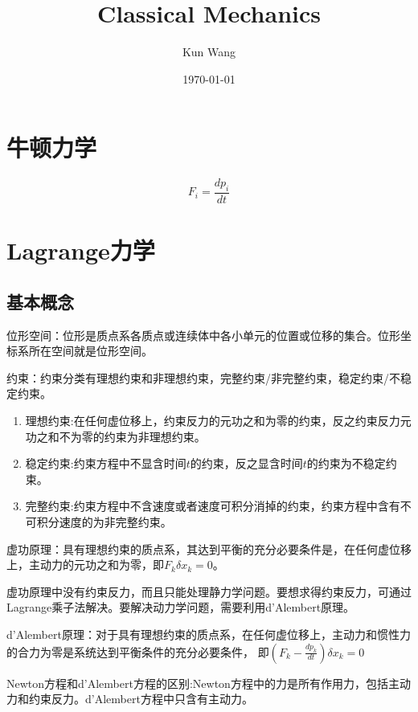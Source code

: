 \documentclass[12pt]{article}
\title{Classical Mechanics}
\author{Kun Wang}
\date{\today}
\numberwithin{equation}{section}
\begin{document}
        \tableofcontents
        \newpage
        \maketitle
        \section{牛顿力学}
        \begin{equation}
            F_i=\frac{dp_i}{dt}
        \end{equation}

        \section{Lagrange力学}

        \subsection{基本概念\cite{2006shen}}

        位形空间：位形是质点系各质点或连续体中各小单元的位置或位移的集合。位形坐标系所在空间就是位形空间。

        约束：约束分类有理想约束和非理想约束，完整约束/非完整约束，稳定约束/不稳定约束。
        \begin{enumerate}
            \item 理想约束:在任何虚位移上，约束反力的元功之和为零的约束，反之约束反力元功之和不为零的约束为非理想约束。
            \item 稳定约束:约束方程中不显含时间$t$的约束，反之显含时间$t$的约束为不稳定约束。
            \item 完整约束:约束方程中不含速度或者速度可积分消掉的约束，约束方程中含有不可积分速度的为非完整约束。
        \end{enumerate}
        
        虚功原理：具有理想约束的质点系，其达到平衡的充分必要条件是，在任何虚位移上，主动力的元功之和为零，即$F_k\delta x_k=0$。

        虚功原理中没有约束反力，而且只能处理静力学问题。要想求得约束反力，可通过Lagrange乘子法解决。要解决动力学问题，需要利用d'Alembert原理。

        d'Alembert原理：对于具有理想约束的质点系，在任何虚位移上，主动力和惯性力的合力为零是系统达到平衡条件的充分必要条件，
        即$\left(F_k-\frac{dp_k}{dt}\right)\delta x_k=0$

        Newton方程和d'Alembert方程的区别:Newton方程中的力是所有作用力，包括主动力和约束反力。d'Alembert方程中只含有主动力。
\end{document}
